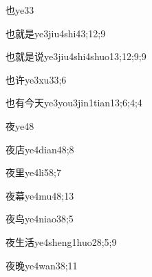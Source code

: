 \begin{verbete}{也}{ye3}{3}
\end{verbete}

\begin{verbete}{也就是}{ye3jiu4shi4}{3;12;9}
\end{verbete}

\begin{verbete}{也就是说}{ye3jiu4shi4shuo1}{3;12;9;9}
\end{verbete}

\begin{verbete}{也许}{ye3xu3}{3;6}
\end{verbete}

\begin{verbete}{也有今天}{ye3you3jin1tian1}{3;6;4;4}
\end{verbete}

\begin{verbete}{夜}{ye4}{8}
\end{verbete}

\begin{verbete}{夜店}{ye4dian4}{8;8}
\end{verbete}

\begin{verbete}{夜里}{ye4li5}{8;7}
\end{verbete}

\begin{verbete}{夜幕}{ye4mu4}{8;13}
\end{verbete}

\begin{verbete}{夜鸟}{ye4niao3}{8;5}
\end{verbete}

\begin{verbete}{夜生活}{ye4sheng1huo2}{8;5;9}
\end{verbete}

\begin{verbete}{夜晚}{ye4wan3}{8;11}
\end{verbete}

